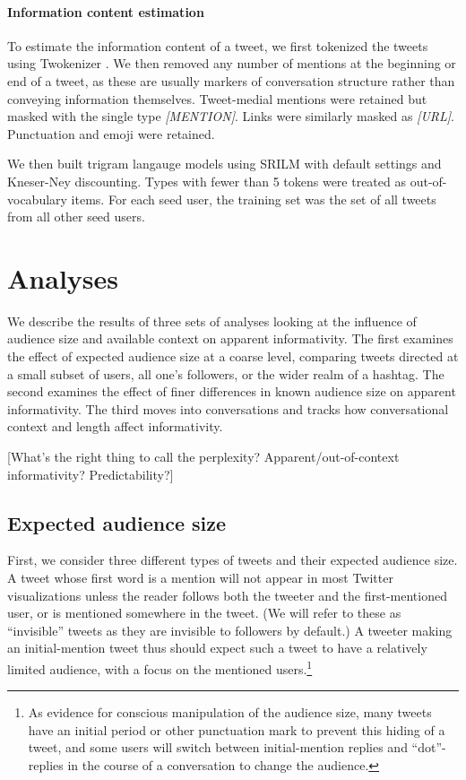 \documentclass[11pt,letterpaper]{article}
\begin{document}
\paragraph{Information content estimation}

To estimate the information content of a tweet, we first tokenized the tweets using Twokenizer \cite{owoputi2013}. We then removed any number of mentions at the beginning or end of a tweet, as these are usually markers of conversation structure rather than conveying information themselves.  Tweet-medial mentions were retained but masked with the single type {\it [MENTION]}. Links were similarly masked as {\it [URL]}. Punctuation and emoji were retained.

We then built trigram langauge models using SRILM with default settings and Kneser-Ney discounting.  Types with fewer than 5 tokens were treated as out-of-vocabulary items. For each seed user, the training set was the set of all tweets from all other seed users.  

\section{Analyses}

We describe the results of three sets of analyses looking at the influence of audience size and available context on apparent informativity. The first examines the effect of expected audience size at a coarse level, comparing tweets directed at a small subset of users, all one's followers, or the wider realm of a hashtag.   The second examines the effect of finer differences in known audience size on apparent informativity.  The third moves into conversations and tracks how conversational context and length affect informativity.

[What's the right thing to call the perplexity? Apparent/out-of-context informativity? Predictability?]

\subsection{Expected audience size}
First, we consider three different types of tweets and their expected audience size.  A tweet whose first word is a mention will not appear in most Twitter visualizations unless the reader follows both the tweeter and the first-mentioned user, or is mentioned somewhere in the tweet. (We will refer to these as ``invisible'' tweets as they are invisible to followers by default.)  A tweeter making an initial-mention tweet thus should expect such a tweet to have a relatively limited audience, with a focus on the mentioned users.\footnote{As evidence for conscious manipulation of the audience size, many tweets have an initial period or other punctuation mark to prevent this hiding of a tweet, and some users will switch between initial-mention replies and ``dot''-replies in the course of a conversation to change the audience.}
\end{document}
